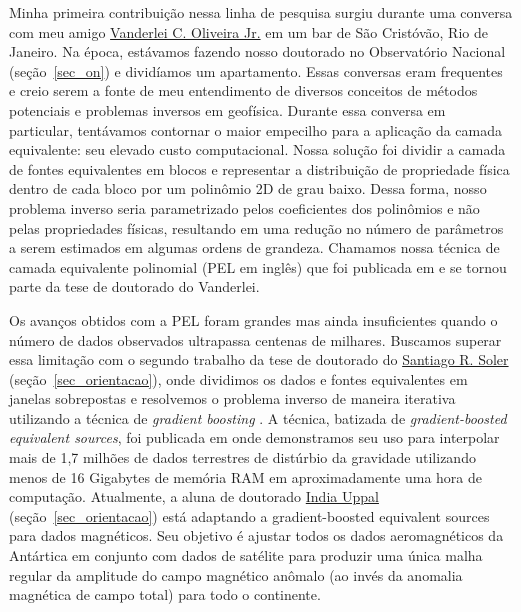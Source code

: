 \documentclass[12pt,a4paper,oneside]{book}
\newcommand{\ON}{Observatório Nacional}
\newcommand{\SantiagoLink}{\href{https://www.santisoler.com/}{Santiago R. Soler}}
\newcommand{\VanderleiLink}{\href{https://www.pinga-lab.org/people/oliveira-jr.html}{Vanderlei C. Oliveira Jr.}}
\newcommand{\IndiaLink}{\href{https://www.compgeolab.org/team/\#indiauppal}{India Uppal}}
\begin{document}
Minha primeira contribuição nessa linha de pesquisa surgiu durante uma conversa
com meu amigo \VanderleiLink{} em um bar de São Cristóvão, Rio de Janeiro.
Na época, estávamos fazendo nosso doutorado no \ON{}
(seção~\ref{sec_on}) e dividíamos um apartamento.
Essas conversas eram frequentes e creio serem a fonte de meu entendimento de
diversos conceitos de métodos potenciais e problemas inversos em geofísica.
Durante essa conversa em particular, tentávamos contornar o maior empecilho
para a aplicação da camada equivalente: seu elevado custo computacional.
Nossa solução foi dividir a camada de fontes equivalentes em blocos e
representar a distribuição de propriedade física dentro de cada bloco por um
polinômio 2D de grau baixo.
Dessa forma, nosso problema inverso seria parametrizado pelos coeficientes dos
polinômios e não pelas propriedades físicas, resultando em uma redução no
número de parâmetros a serem estimados em algumas ordens de grandeza.
Chamamos nossa técnica de camada equivalente polinomial (PEL em inglês) que foi
publicada em \citet{OliveiraJr2013} e se tornou parte da tese de doutorado do
Vanderlei.

Os avanços obtidos com a PEL foram grandes mas ainda insuficientes quando o
número de dados observados ultrapassa centenas de milhares.
Buscamos superar essa limitação com o segundo trabalho da tese de doutorado
do \SantiagoLink{} (seção~\ref{sec_orientacao}), onde dividimos os dados e
fontes equivalentes em janelas sobrepostas e resolvemos o problema inverso de
maneira iterativa utilizando a técnica de \textit{gradient boosting}
\citep{Friedman2001}.
A técnica, batizada de \textit{gradient-boosted equivalent sources}, foi
publicada em \citet{Soler2021} onde demonstramos seu uso para interpolar
mais de 1,7 milhões de dados terrestres de distúrbio da gravidade utilizando
menos de 16 Gigabytes de memória RAM em aproximadamente uma hora de computação.
Atualmente, a aluna de doutorado \IndiaLink{} (seção~\ref{sec_orientacao})
está adaptando a gradient-boosted equivalent sources para dados magnéticos.
Seu objetivo é ajustar todos os dados aeromagnéticos da Antártica em conjunto
com dados de satélite para produzir uma única malha regular da amplitude do
campo magnético anômalo (ao invés da anomalia magnética de campo total) para
todo o continente.
\end{document}

